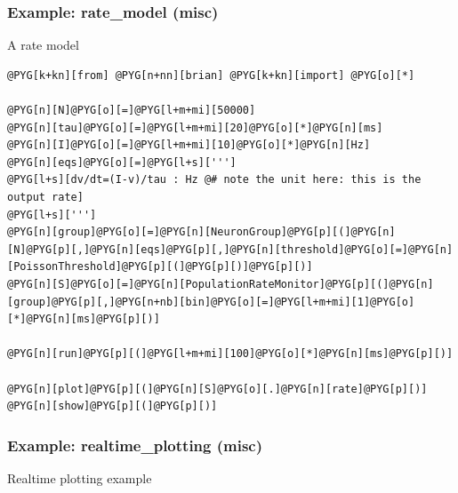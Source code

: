 \documentclass[letterpaper,10pt,english]{manual}
\begin{document}
\resetcurrentobjects
\hypertarget{--doc-examples-misc_rate_model}{}

\hypertarget{index-63}{}\subsubsection{Example: rate\_model (misc)}

A rate model

\begin{Verbatim}[commandchars=@\[\]]
@PYG[k+kn][from] @PYG[n+nn][brian] @PYG[k+kn][import] @PYG[o][*]

@PYG[n][N]@PYG[o][=]@PYG[l+m+mi][50000]
@PYG[n][tau]@PYG[o][=]@PYG[l+m+mi][20]@PYG[o][*]@PYG[n][ms]
@PYG[n][I]@PYG[o][=]@PYG[l+m+mi][10]@PYG[o][*]@PYG[n][Hz]
@PYG[n][eqs]@PYG[o][=]@PYG[l+s][''']
@PYG[l+s][dv/dt=(I-v)/tau : Hz @# note the unit here: this is the output rate]
@PYG[l+s][''']
@PYG[n][group]@PYG[o][=]@PYG[n][NeuronGroup]@PYG[p][(]@PYG[n][N]@PYG[p][,]@PYG[n][eqs]@PYG[p][,]@PYG[n][threshold]@PYG[o][=]@PYG[n][PoissonThreshold]@PYG[p][(]@PYG[p][)]@PYG[p][)]
@PYG[n][S]@PYG[o][=]@PYG[n][PopulationRateMonitor]@PYG[p][(]@PYG[n][group]@PYG[p][,]@PYG[n+nb][bin]@PYG[o][=]@PYG[l+m+mi][1]@PYG[o][*]@PYG[n][ms]@PYG[p][)]

@PYG[n][run]@PYG[p][(]@PYG[l+m+mi][100]@PYG[o][*]@PYG[n][ms]@PYG[p][)]

@PYG[n][plot]@PYG[p][(]@PYG[n][S]@PYG[o][.]@PYG[n][rate]@PYG[p][)]
@PYG[n][show]@PYG[p][(]@PYG[p][)]
\end{Verbatim}

\resetcurrentobjects
\hypertarget{--doc-examples-misc_realtime_plotting}{}

\hypertarget{index-64}{}\subsubsection{Example: realtime\_plotting (misc)}

Realtime plotting example
\end{document}
